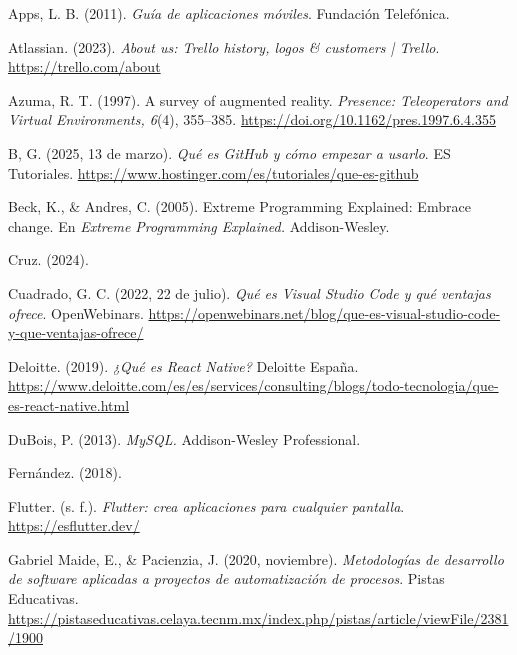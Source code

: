 \begin{referenciasapa}
\item Apps, L. B. (2011). \textit{Guía de aplicaciones móviles}. Fundación Telefónica.

\item Atlassian. (2023). \textit{About us: Trello history, logos \& customers | Trello}. \url{https://trello.com/about}

\item Azuma, R. T. (1997). A survey of augmented reality. \textit{Presence: Teleoperators and Virtual Environments, 6}(4), 355--385. \url{https://doi.org/10.1162/pres.1997.6.4.355}

\item B, G. (2025, 13 de marzo). \textit{Qué es GitHub y cómo empezar a usarlo}. ES Tutoriales. \url{https://www.hostinger.com/es/tutoriales/que-es-github}

\item Beck, K., \& Andres, C. (2005). Extreme Programming Explained: Embrace change. En \textit{Extreme Programming Explained.} Addison-Wesley.

\item Cruz. (2024). 

\item Cuadrado, G. C. (2022, 22 de julio). \textit{Qué es Visual Studio Code y qué ventajas ofrece}. OpenWebinars. \url{https://openwebinars.net/blog/que-es-visual-studio-code-y-que-ventajas-ofrece/}

\item Deloitte. (2019). \textit{¿Qué es React Native?} Deloitte España. \url{https://www.deloitte.com/es/es/services/consulting/blogs/todo-tecnologia/que-es-react-native.html}

\item DuBois, P. (2013). \textit{MySQL.} Addison-Wesley Professional.

\item Fernández. (2018). 

\item Flutter. (s. f.). \textit{Flutter: crea aplicaciones para cualquier pantalla}. \url{https://esflutter.dev/}

\item Gabriel Maide, E., \& Pacienzia, J. (2020, noviembre). \textit{Metodologías de desarrollo de software aplicadas a proyectos de automatización de procesos}. Pistas Educativas. \url{https://pistaseducativas.celaya.tecnm.mx/index.php/pistas/article/viewFile/2381/1900}


\end{referenciasapa}
